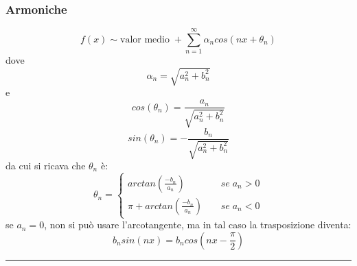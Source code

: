 \subsubsection*{Armoniche}
\[
    f(x) \sim \text{valor medio}\; + \sum_{n=1}^{\infty}\alpha_n cos(nx + \theta_n)
\]
dove
\[
    \alpha_n = \sqrt{a_n^2 + b_n^2}
\]
e
\[
    cos(\theta_n) = \frac{a_n}{\sqrt{a_n^2 + b_n^2}}
\]
\[
    sin(\theta_n) = -\frac{b_n}{\sqrt{a_n^2 + b_n^2}}
\]
da cui si ricava che $\theta_n$ è:
\[
    \theta_n = \begin{cases}
        arctan\left(\frac{-b_n}{a_n}\right) \;\;\;\; &se \; a_n > 0\\
        \pi + arctan\left(\frac{-b_n}{a_n}\right) \;\;\;\;& se \; a_n < 0
    \end{cases}
\]
se $a_n = 0$, non si può usare l'arcotangente, ma in tal caso la trasposizione diventa:
\[
    b_n sin(nx) = b_n cos(nx - \frac{\pi}{2})
\]
\rule{\textwidth}{2pt}